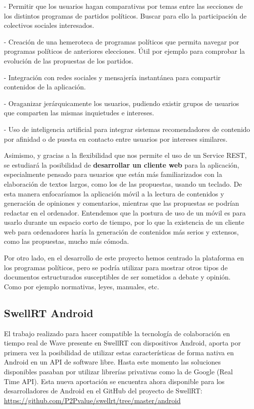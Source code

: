 - Permitir que los usuarios hagan comparativas por temas entre las secciones de los distintos programas de partidos políticos. Buscar para ello la participación de colectivos sociales interesados.  

- Creación de una hemeroteca de programas políticos que permita navegar por programas políticos de anteriores elecciones. Útil por ejemplo para comprobar la evolución de las propuestas de los partidos.

- Integración con redes sociales y mensajería instantánea para compartir contenidos de la aplicación.

- Oraganizar jerárquicamente los usuarios, pudiendo existir grupos de usuarios que comparten las mismas inquietudes e intereses.

- Uso de inteligencia artificial para integrar sistemas recomendadores de contenido por afinidad o de puesta en contacto entre usuarios por intereses similares.
 
Asimismo, y gracias a la flexibilidad que nos permite el uso de un Service REST, se estudiará la posibilidad de \textbf{desarrollar un cliente web} para la aplicación, especialmente pensado para usuarios que están más familiarizados con la elaboración de textos largos, como los de las propuestas, usando un teclado. De esta manera enfocaríamos la aplicación móvil a la lectura de contenidos y generación de opiniones y comentarios, mientras que las propuestas se podrían redactar en el ordenador. Entendemos que la postura de uso de un móvil es para usarlo durante un espacio corto de tiempo, por lo que la existencia de un cliente web para ordenadores haría la generación de contenidos más serios y extensos, como las propuestas, mucho más cómoda.

Por otro lado, en el desarrollo de este proyecto hemos centrado la plataforma en los programas políticos, pero se podría utilizar para mostrar otros tipos de documentos estructurados susceptibles de ser sometidos a debate y opinión. Como por ejemplo normativas, leyes, manuales, etc.

\subsection{SwellRT Android}

El trabajo realizado para hacer compatible la tecnología de colaboración en tiempo real de Wave presente en SwellRT con dispositivos Android, aporta por primera vez la posibilidad de utilizar estas características de forma nativa en Android en un API de software libre. Hasta este momento las soluciones disponibles pasaban por utilizar librerías privativas como la de Google (Real Time API). Esta nueva aportación se encuentra ahora disponible para los desarrolladores de Android en el GitHub del proyecto de SwellRT: \url{https://github.com/P2Pvalue/swellrt/tree/master/android}

